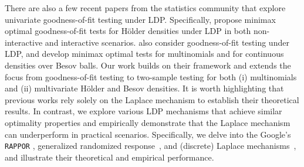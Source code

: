 \documentclass[twoside,11pt]{article}
\begin{document}
There are also a few recent papers from the statistics community that explore univariate goodness-of-fit testing under LDP. Specifically, \citet{Dubois2022} propose minimax optimal goodness-of-fit tests for H\"{o}lder densities under LDP in both non-interactive and interactive scenarios. \citet{Lam-Weil2021MinimaxConstraint} also consider goodness-of-fit testing under LDP, and develop minimax optimal tests for multinomials and for continuous densities over Besov balls. Our work builds on their framework and extends the focus from goodness-of-fit testing to two-sample testing for both (i) multinomials and (ii) multivariate H\"{o}lder and Besov densities. It is worth highlighting that previous works \citep{Lam-Weil2021MinimaxConstraint, Dubois2022} rely  solely on the Laplace mechanism \citep{Dwork2014Book} to establish their theoretical results. In contrast, we explore various LDP mechanisms that achieve similar optimality properties and empirically demonstrate that the Laplace mechanism can underperform in practical scenarios. Specifically, we delve into the Google's \texttt{RAPPOR} \citep{erlingsson_rappor_2014}, generalized randomized response~\citep{Gaboardi2018LDPChisq}, and (discrete) Laplace mechanisms~\citep{ghosh2009}, and illustrate their theoretical and empirical performance.
\end{document}
